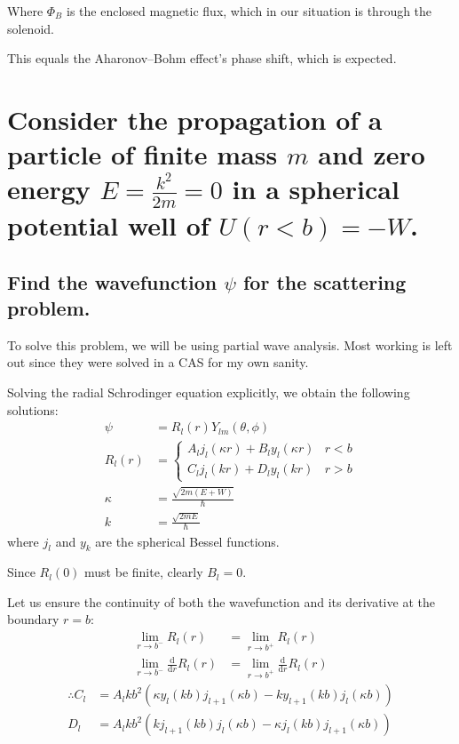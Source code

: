 \documentclass[a4paper]{scrartcl}
\begin{document}
Where \(\Phi_B\) is the enclosed magnetic flux, which in our situation is through the solenoid.

This equals the Aharonov--Bohm effect's phase shift, which is expected.

\section{Consider the propagation of a particle of finite mass \(m\) and zero energy \(E = \frac{k^2}{2 m} = 0\) in a spherical potential well of \(U(r < b) = -W\).}
\subsection{Find the wavefunction \(\psi\) for the scattering problem.}
To solve this problem, we will be using partial wave analysis. Most working is left out since they were solved in a CAS for my own sanity.

Solving the radial Schrodinger equation explicitly, we obtain the following solutions:
\begin{align*}
    \psi &= R_l(r) Y_{l m}(\theta, \phi) \\
    R_l(r) &= \begin{cases}
        A_l j_l(\kappa r) + B_l y_l(\kappa r) & r < b \\
        C_l j_l(k r) + D_l y_l(k r) & r > b
    \end{cases} \\
    \kappa &= \frac{\sqrt{2 m (E + W)}}{\hbar} \\
    k &= \frac{\sqrt{2 m E}}{\hbar}
\end{align*}
where \(j_l\) and \(y_k\) are the spherical Bessel functions.

Since \(R_l(0)\) must be finite, clearly \(B_l = 0\).

Let us ensure the continuity of both the wavefunction and its derivative at the boundary \(r = b\):
\begin{align*}
    \lim_{r \to b^-} R_l(r) &= \lim_{r \to b^+} R_l(r) \\
    \lim_{r \to b^-} \frac{\mathrm{d}}{\mathrm{d} r} R_l(r) &= \lim_{r \to b^+} \frac{\mathrm{d}}{\mathrm{d} r} R_l(r)
\end{align*}
\begin{align*}
    \therefore C_l &= A_l k b^2 (\kappa y_l(k b) j_{l + 1}(\kappa b) - k y_{l + 1}(k b) j_l(\kappa b)) \\
    D_l &= A_l k b^2 (k j_{l + 1}(k b) j_l(\kappa b) - \kappa j_l(k b) j_{l + 1}(\kappa b))
\end{align*}
\end{document}
